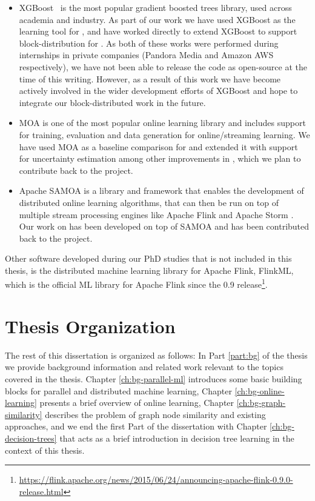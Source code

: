 \begin{itemize}
	\item XGBoost~\cite{xgboost} is the most popular gradient boosted trees library,
	used across academia and industry. As part of our work we have used XGBoost as the
	learning tool for \sessionlength, and have worked directly to extend XGBoost to
	support block-distribution
	for \blockgbt. As both of these works were performed during internships in private
	companies (Pandora Media and Amazon AWS respectively), we have not been able to release
	the code as open-source at the time of this writing.
	However, as a result of this work we have become actively involved in the wider
	development efforts of XGBoost and hope to integrate our block-distributed
	work in the future.
	\item MOA \cite{moa-book} is one of the most popular online learning library and includes
	support for training, evaluation and data generation for online/streaming learning.
	We have used MOA as a baseline comparison for \boostvht and extended it with
	support for uncertainty estimation among other improvements in \uncertaintrees,
	which we plan to contribute back to the project.
	\item Apache SAMOA \cite{samoa} is a library and framework that enables the development
	of distributed online learning algorithms, that can then be run on top of multiple
	stream processing engines like Apache Flink \cite{flink} and Apache Storm \cite{storm}.
	Our work on \boostvht has been developed on top of SAMOA and has been contributed back
	to the project.
\end{itemize}

Other software developed during our PhD studies that is not included in this
thesis, is the distributed machine learning library for
Apache Flink, FlinkML, which is the official ML library for Apache Flink
since the 0.9 release\footnote{\url{https://flink.apache.org/news/2015/06/24/announcing-apache-flink-0.9.0-release.html}}.

\section{Thesis Organization}

The rest of this dissertation is organized as follows:
In Part \ref{part:bg} of the thesis we provide background information and
related work relevant to the topics covered in the thesis. Chapter
\ref{ch:bg-parallel-ml} introduces some basic building blocks
for parallel and distributed machine learning, Chapter \ref{ch:bg-online-learning}
presents a brief overview of online learning, Chapter \ref{ch:bg-graph-similarity} describes the problem
of graph node similarity and existing approaches, and we end the first Part of the dissertation
with Chapter \ref{ch:bg-decision-trees} that acts as a brief introduction
in decision tree learning in the context of this thesis.

